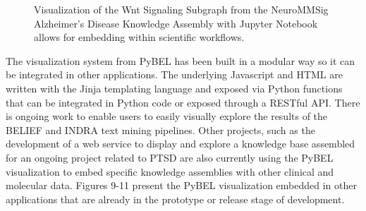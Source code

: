 \begin{figure}
\captionsetup{format=plain}
\caption[PyBEL Visualization of Wnt Signaling in Jupyter Notebook]{Visualization of the Wnt Signaling Subgraph from the NeuroMMSig Alzheimer’s Disease Knowledge Assembly with Jupyter Notebook allows for embedding within scientific workflows.}
\label{Fig:wnt_jupyter}
\end{figure}

The visualization system from PyBEL has been built in a modular way so it can be integrated in other applications. The underlying Javascript and \ac{HTML} are written with the Jinja templating language \cite{jinja} and exposed via Python functions that can be integrated in Python code or exposed through a RESTful \ac{API}. There is ongoing work to enable users to easily visually explore the results of the \ac{BELIEF} \cite{Madan2016} and \ac{INDRA} \cite{indra} text mining pipelines. Other projects, such as the development of a web service to display and explore a knowledge base assembled for an ongoing project related to \ac{PTSD} are also currently using the PyBEL visualization to embed specific knowledge assemblies with other clinical and molecular data. Figures 9-11 present the PyBEL visualization embedded in other applications that are already in the prototype or release stage of development.

